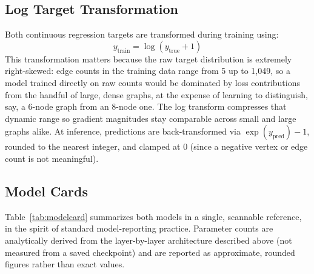 \documentclass[11pt,letterpaper]{article}
\numberwithin{equation}{section}
\numberwithin{figure}{section}
\numberwithin{table}{section}
\begin{document}
\subsection{Log Target Transformation}
Both continuous regression targets are transformed during training using:
\begin{equation*}
y_{\text{train}} = \log(y_{\text{true}} + 1)
\end{equation*}
This transformation matters because the raw target distribution is extremely right-skewed: edge counts in the training data range from 5 up to 1,049, so a model trained directly on raw counts would be dominated by loss contributions from the handful of large, dense graphs, at the expense of learning to distinguish, say, a 6-node graph from an 8-node one. The log transform compresses that dynamic range so gradient magnitudes stay comparable across small and large graphs alike. At inference, predictions are back-transformed via $\exp(y_{\text{pred}}) - 1$, rounded to the nearest integer, and clamped at 0 (since a negative vertex or edge count is not meaningful).

\subsection{Model Cards}
\label{sec:modelcards}
Table~\ref{tab:modelcard} summarizes both models in a single, scannable reference, in the spirit of standard model-reporting practice. Parameter counts are analytically derived from the layer-by-layer architecture described above (not measured from a saved checkpoint) and are reported as approximate, rounded figures rather than exact values.
\end{document}
